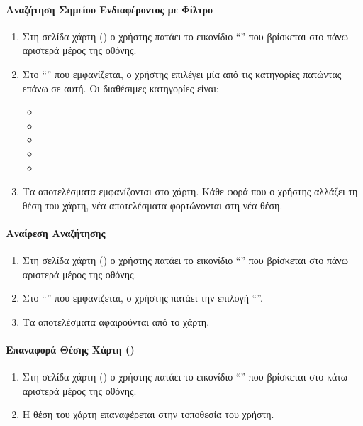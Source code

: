 \paragraph{Αναζήτηση Σημείου Ενδιαφέροντος με Φίλτρο}
\begin{enumerate}
    \item Στη σελίδα χάρτη (\textit{}) ο χρήστης πατάει το εικονίδιο ``'' που βρίσκεται στο πάνω αριστερά μέρος της οθόνης.
    \item Στο ``'' που εμφανίζεται, ο χρήστης επιλέγει μία από τις κατηγορίες πατώντας επάνω σε αυτή. Οι διαθέσιμες κατηγορίες είναι:
    \begin{itemize}
        \item {}
        \item {}
        \item {}
        \item {}
        \item {}
    \end{itemize}
    \item Τα αποτελέσματα εμφανίζονται στο χάρτη. Κάθε φορά που ο χρήστης αλλάζει τη θέση του χάρτη, νέα αποτελέσματα φορτώνονται στη νέα θέση.
\end{enumerate}

\paragraph{Αναίρεση Αναζήτησης}
\begin{enumerate}
    \item Στη σελίδα χάρτη (\textit{}) ο χρήστης πατάει το εικονίδιο ``'' που βρίσκεται στο πάνω αριστερά μέρος της οθόνης.
    \item Στο ``'' που εμφανίζεται, ο χρήστης πατάει την επιλογή ``''.
    \item Τα αποτελέσματα αφαιρούνται από το χάρτη.
\end{enumerate}

\paragraph{Επαναφορά Θέσης Χάρτη (\textit{})}
\begin{enumerate}
    \item Στη σελίδα χάρτη (\textit{}) ο χρήστης πατάει το εικονίδιο ``'' που βρίσκεται στο κάτω αριστερά μέρος της οθόνης.
    \item Η θέση του χάρτη επαναφέρεται στην τοποθεσία του χρήστη.
\end{enumerate}


